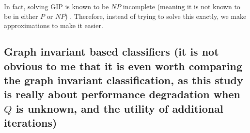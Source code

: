 In fact, solving GIP is known to be $NP$ incomplete (meaning it is not known to be in either $P$ or $NP$) \cite{??}.  Therefore, instead of trying to solve this exactly, we make approximations to make it easier.  


% 
% 
% 
\subsection{Graph invariant based classifiers (it is not obvious to me that it is even worth comparing the graph invariant classification, as this study is really about performance degradation when $Q$ is unknown, and the utility of additional iterations)} %
\label{sub:graph_invariant_based_classifiers}

